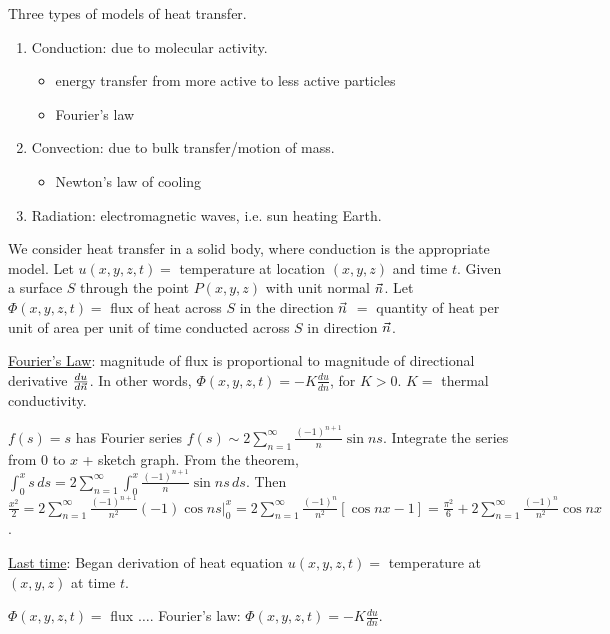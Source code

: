 \documentclass[]{article}
\begin{document}
Three types of models of heat transfer.
\begin{enumerate}
	\item Conduction: due to molecular activity.
	\begin{itemize}
		\item energy transfer from more active to less active particles
		\item Fourier's law
	\end{itemize}
	\item Convection: due to bulk transfer/motion of mass.
	\begin{itemize}
		\item Newton's law of cooling
	\end{itemize}
	\item Radiation: electromagnetic waves, i.e. sun heating Earth.
\end{enumerate}
We consider heat transfer in a solid body, where conduction is the appropriate model.
Let $u(x,y,z,t) = $ temperature at location $(x,y,z)$ and time $t$.
Given a surface $S$ through the point $P(x,y,z)$ with unit normal $\vec{n}$. Let $\Phi(x,y,z,t) = $ flux of heat across $S$ in the direction $\vec{n}$ $ = $ quantity of heat per unit of area per unit of time conducted across $S$ in direction $\vec{n}$.

\begin{definition}
	\underline{Fourier's Law}: magnitude of flux is proportional to magnitude of directional derivative $\frac{du}{d\vec{n}}$.
	In other words, $\Phi(x,y,z,t) = -K \frac{du}{dn}$, for $K>0$. $K = $ thermal conductivity.
\end{definition}

\begin{example}
	 $f(s) = s $ has Fourier series $f(s) \sim 2\sum_{n=1}^\infty \frac{(-1)^{n+1}}{n}\sin{ns}$. Integrate the series from 0 to $x$ + sketch graph. From the theorem, $\int_0^x s\, ds = 2 \sum_{n=1}^\infty \int_0^x \frac{(-1)^{n+1}}{n} \sin{ns} \, ds$. Then $\frac{x^2}{2} = 2\sum_{n=1}^\infty \frac{(-1)^{n+1}}{n^2}(-1)\cos{ns} \big\rvert_0^x = 2\sum_{n=1}^\infty \frac{(-1)^n}{n^2} [\cos{nx}-1] = \frac{\pi^2}{6} + 2\sum_{n=1}^\infty \frac{(-1)^n}{n^2}\cos{nx} $.
\end{example}

\underline{Last time}: Began derivation of heat equation $u(x,y,z,t) = $ temperature at $(x,y,z)$ at time $t$. 

$\Phi(x,y,z,t) = $ flux $\dots$.
Fourier's law: $\Phi(x,y,z,t) = -K \frac{du}{dn}$.
\end{document}
